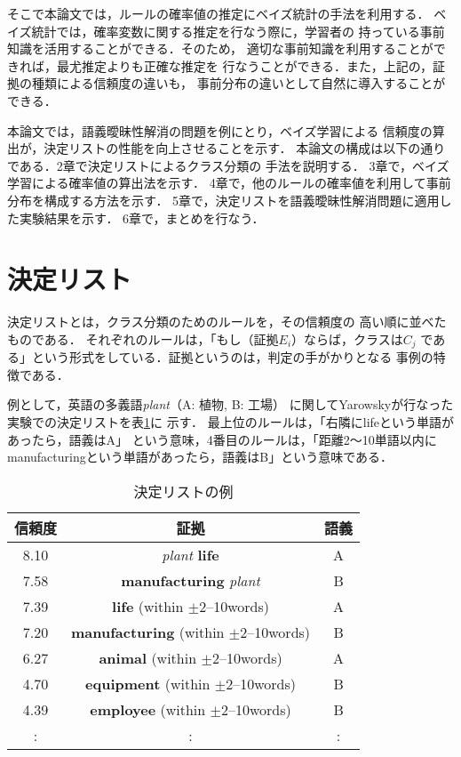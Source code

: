 そこで本論文では，ルールの確率値の推定にベイズ統計の手法を利用する．
ベイズ統計では，確率変数に関する推定を行なう際に，学習者の
持っている事前知識を活用することができる．そのため，
適切な事前知識を利用することができれば，最尤推定よりも正確な推定を
行なうことができる．また，上記の，証拠の種類による信頼度の違いも，
事前分布の違いとして自然に導入することができる．

本論文では，語義曖昧性解消の問題を例にとり，ベイズ学習による
信頼度の算出が，決定リストの性能を向上させることを示す．
本論文の構成は以下の通りである．2章で決定リストによるクラス分類の
手法を説明する．
3章で，ベイズ学習による確率値の算出法を示す．
4章で，他のルールの確率値を利用して事前分布を構成する方法を示す．
5章で，決定リストを語義曖昧性解消問題に適用した実験結果を示す．
6章で，まとめを行なう．

\section{決定リスト}

決定リストとは，クラス分類のためのルールを，その信頼度の
高い順に並べたものである．
それぞれのルールは，「もし（証拠$E_i$）ならば，クラスは$C_j$
である」という形式をしている．証拠というのは，判定の手がかりとなる
事例の特徴である．

例として，英語の多義語{\it plant}（A: 植物, B: 工場）
に関してYarowskyが行なった実験での決定リストを表\ref{tab:ex_dlist}に
示す\cite{Yarowsky:Decision}．
最上位のルールは，「右隣にlifeという単語があったら，語義はA」
という意味，4番目のルールは，「距離2〜10単語以内にmanufacturingという単語があったら，語義はB」という意味である．

\begin{table}
  \caption{決定リストの例}
  
  \label{tab:ex_dlist}
\begin{center}
\begin{tabular}{ccc} \hline\hline
信頼度 & 証拠 & 語義\\ \hline
8.10&	{\it plant} {\bf life}	&	A\\
7.58&	{\bf manufacturing} {\it plant}	&	B\\
7.39&	{\bf life} (within $\pm$2--10words)	&	A\\
7.20&	{\bf manufacturing} (within $\pm$2--10words)	&	B\\
6.27&	{\bf animal} (within $\pm$2--10words)	&	A\\
4.70&	{\bf equipment} (within $\pm$2--10words)	&	B\\
4.39&	{\bf employee} (within $\pm$2--10words)	&	B\\
:&	:	&	:\\
\hline
\end{tabular}
\end{center}
\end{table}

